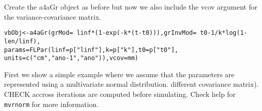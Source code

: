 \documentclass[a4paper,english,10pt]{article}\usepackage[]{graphicx}\usepackage[]{color}
\makeatletter
\newcommand{\hlnum}[1]{\textcolor[rgb]{0.2,0.2,0.2}{#1}}%
\newcommand{\hlstr}[1]{\textcolor[rgb]{0.2,0.2,0.2}{#1}}%
\newcommand{\hlopt}[1]{\textcolor[rgb]{0.2,0.2,0.2}{#1}}%
\newcommand{\hlstd}[1]{\textcolor[rgb]{0,0,0}{#1}}%
\newcommand{\hlkwb}[1]{\textcolor[rgb]{0.361,0.506,0.596}{#1}}%
\newcommand{\hlkwc}[1]{\textcolor[rgb]{0.361,0.506,0.596}{#1}}%
\newcommand{\hlkwd}[1]{\textcolor[rgb]{0.361,0.506,0.596}{#1}}%
\newenvironment{kframe}{%
 \def\at@end@of@kframe{}%
 \ifinner\ifhmode%
  \def\at@end@of@kframe{\end{minipage}}%
  \begin{minipage}{\columnwidth}%
 \fi\fi%
 \def\FrameCommand##1{\hskip\@totalleftmargin \hskip-\fboxsep
 \colorbox{shadecolor}{##1}\hskip-\fboxsep
     \hskip-\linewidth \hskip-\@totalleftmargin \hskip\columnwidth}%
 \MakeFramed {\advance\hsize-\width
   \@totalleftmargin\z@ \linewidth\hsize
   \@setminipage}}%
 {\par\unskip\endMakeFramed%
 \at@end@of@kframe}
\newenvironment{knitrout}{}{} %
\newcommand{\code}[1]{{\texttt{#1}}}
\makeatother
\begin{document}
Create the a4aGr object as before but now we also include the vcov argument for the variance-covariance matrix.
\begin{knitrout}
\color{fgcolor}\begin{kframe}
\begin{alltt}
\hlstd{vbObj} \hlkwb{<-} \hlkwd{a4aGr}\hlstd{(}\hlkwc{grMod}\hlstd{=}\hlopt{~}\hlstd{linf}\hlopt{*}\hlstd{(}\hlnum{1}\hlopt{-}\hlkwd{exp}\hlstd{(}\hlopt{-}\hlstd{k}\hlopt{*}\hlstd{(t}\hlopt{-}\hlstd{t0))),} \hlkwc{grInvMod}\hlstd{=}\hlopt{~}\hlstd{t0}\hlopt{-}\hlnum{1}\hlopt{/}\hlstd{k}\hlopt{*}\hlkwd{log}\hlstd{(}\hlnum{1}\hlopt{-}\hlstd{len}\hlopt{/}\hlstd{linf),}
               \hlkwc{params}\hlstd{=}\hlkwd{FLPar}\hlstd{(}\hlkwc{linf}\hlstd{=p[}\hlstr{"linf"}\hlstd{],} \hlkwc{k}\hlstd{=p[}\hlstr{"k"}\hlstd{],} \hlkwc{t0}\hlstd{=p[}\hlstr{"t0"}\hlstd{],}
                            \hlkwc{units}\hlstd{=}\hlkwd{c}\hlstd{(}\hlstr{"cm"}\hlstd{,}\hlstr{"ano-1"}\hlstd{,}\hlstr{"ano"}\hlstd{)),} \hlkwc{vcov}\hlstd{=mm)}
\end{alltt}
\end{kframe}
\end{knitrout}

First we show a simple example where we assume that the parameters are represented 
using a multivariate normal distribution.
different covariance matrix). CHECK
accross iterations are computed before simulating. Check help for \code{mvrnorm} for more information.
\end{document}
